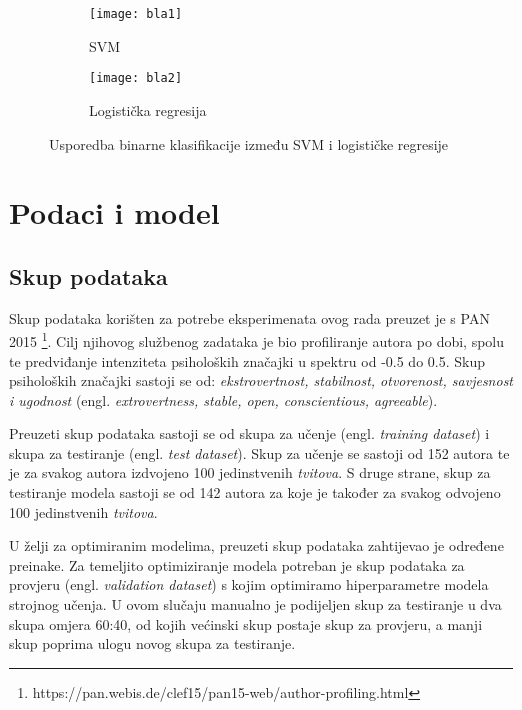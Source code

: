 \documentclass[times, utf8, zavrsni]{fer}
\begin{document}
\begin{figure}
	\centering
	\begin{subfigure}{.5\textwidth}
		\centering
		\texttt{[image: bla1]}
		\caption{SVM}
		\label{fig:sub1}
	\end{subfigure}%
	\begin{subfigure}{.5\textwidth}
		\centering
		\texttt{[image: bla2]}
		\caption{Logistička regresija}
		\label{fig:sub2}
	\end{subfigure}
	\caption{Usporedba binarne klasifikacije između SVM i logističke regresije \protect\footnotemark}
	\label{fig:test}
\end{figure}





\chapter{Podaci i model}
\section{Skup podataka}

Skup podataka korišten za potrebe eksperimenata ovog rada preuzet je s PAN 2015 \citep{description_paper}\footnote{https://pan.webis.de/clef15/pan15-web/author-profiling.html}. Cilj njihovog službenog zadataka je bio profiliranje autora po dobi, spolu te predviđanje intenziteta psiholoških značajki u spektru od -0.5 do 0.5. Skup psiholoških značajki sastoji se od: \textit{ekstrovertnost, stabilnost, otvorenost, savjesnost i ugodnost} (engl. \textit{extrovertness, stable, open, conscientious, agreeable}).
 
Preuzeti skup podataka sastoji se od skupa za učenje (engl. \textit{training dataset}) i skupa za testiranje (engl. \textit{test dataset}). Skup za učenje se sastoji od 152 autora te je za svakog autora izdvojeno 100 jedinstvenih \textit{tvitova}. S druge strane, skup za testiranje modela sastoji se od 142 autora za koje je također za svakog odvojeno 100 jedinstvenih \textit{tvitova}.

U želji za optimiranim modelima, preuzeti skup podataka zahtijevao je određene preinake. Za temeljito optimiziranje modela potreban je skup podataka za provjeru (engl. \textit{validation dataset}) s kojim optimiramo hiperparametre modela strojnog učenja. U ovom slučaju manualno je podijeljen skup za testiranje u dva skupa omjera 60:40, od kojih većinski skup postaje skup za provjeru, a manji skup poprima ulogu novog skupa za testiranje.
\end{document}
